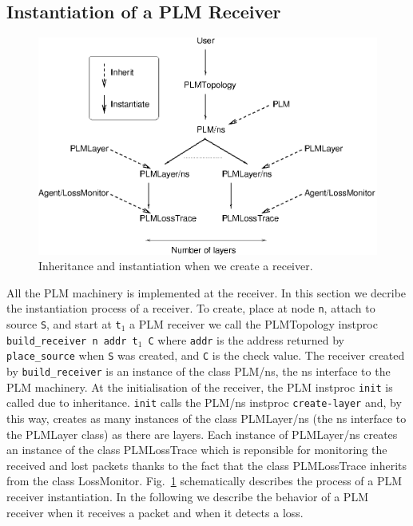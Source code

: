 {\subsection{Instantiation of a PLM Receiver}

\begin{figure}[tbp]
  \centerline{\includegraphics{figures/instanPLMrecv.eps}}
  \caption{Inheritance and instantiation when we create a receiver.}
  \label{fig:instanPLMrecv}
\end{figure}

All the PLM machinery is implemented at the receiver. In this section we decribe
the instantiation process of a receiver. To create, place at node
{\tt n},  attach to source {\tt S}, and start at {\tt t$_1$} a PLM receiver we
call the PLMTopology instproc {\tt 
  build\_receiver n addr t$_1$ C} where {\tt addr} is the address returned
by {\tt place\_source} when {\tt S} was created, and {\tt C} is the check value. The
receiver created by {\tt build\_receiver} is an instance of the class PLM/ns,
the ns interface to the PLM 
machinery. At the initialisation of the receiver, the PLM instproc {\tt init} is
called due to inheritance. {\tt init} calls the PLM/ns instproc
{\tt create-layer} and, by this way,  creates as many instances of the class 
PLMLayer/ns (the ns interface to the PLMLayer class) as there are layers. Each
instance of PLMLayer/ns creates an instance of the class PLMLossTrace which is
reponsible for 
monitoring the received and lost packets thanks to the fact that the class
PLMLossTrace inherits from the class LossMonitor. 
Fig.~\ref{fig:instanPLMrecv} schematically describes the process  of a PLM
receiver instantiation. In the following we describe the behavior of a PLM
receiver when it receives a packet and when it detects a loss.



}
